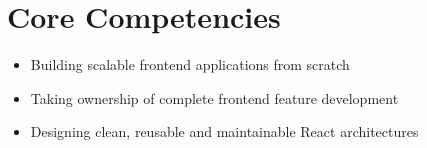 \section{Core Competencies}

\begin{itemize}
    \item Building scalable frontend applications from scratch
    \item Taking ownership of complete frontend feature development
    \item Designing clean, reusable and maintainable React architectures
\end{itemize}